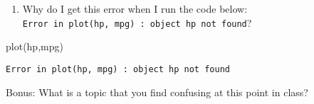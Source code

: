 \documentclass[
]{book}
\newenvironment{Shaded}{\begin{snugshade}}{\end{snugshade}}
\newcommand{\FunctionTok}[1]{\textcolor[rgb]{0.00,0.00,0.00}{#1}}
\newcommand{\NormalTok}[1]{#1}
\providecommand{\tightlist}{%
  \setlength{\itemsep}{0pt}\setlength{\parskip}{0pt}}
\begin{document}
\begin{enumerate}
\def\labelenumi{\arabic{enumi}.}
\setcounter{enumi}{5}
\tightlist
\item
  Why do I get this error when I run the code below: \texttt{Error\ in\ plot(hp,\ mpg)\ :\ object\ \textquotesingle{}hp\textquotesingle{}\ not\ found}?
\end{enumerate}

\begin{Shaded}
\begin{Highlighting}[]
\FunctionTok{plot}\NormalTok{(hp,mpg)}
\end{Highlighting}
\end{Shaded}

\texttt{Error\ in\ plot(hp,\ mpg)\ :\ object\ \textquotesingle{}hp\textquotesingle{}\ not\ found}

Bonus: What is a topic that you find confusing at this point in class?

  
\end{document}
